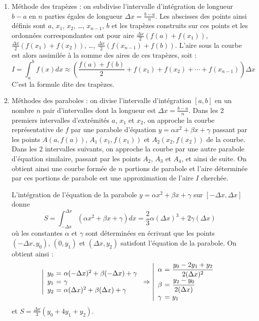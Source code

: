 \documentclass[11pt,a4paper,colorlinks,breaklinks]{article}
\begin{document}
\begin{enumerate}
\item Méthode des trapèzes : on subdivise l'intervalle d'intégration de
	longueur $b-a$ en $n$ parties égales de longueur 
	$\displaystyle\Delta x = \frac{b-a}{n}$. Les abscisses des points ainsi
	définis sont
	$a$, $x_1$, $x_2$, \ldots, $x_{n-1}$, $b$ et les trapèzes construits sur ces
	points et les ordonnées correspondantes ont pour aire 
	$\displaystyle \frac{\Delta x}{2}\left(f(a) + f(x_1)\right)$,
	$\displaystyle \frac{\Delta x}{2}\left(f(x_1) + f(x_2)\right)$,
	\ldots,
	$\displaystyle \frac{\Delta x}{2}\left(f(x_{n-1}) + f(b)\right)$.
	L'aire sous la courbe est alors assimilée à la somme des aires de ces 
	trapèzes, soit :
	$$\displaystyle I = \int_a^b f(x)dx \approx
		\left(\frac{f(a)+f(b)}{2} + f(x_1) + f(x_2)
		+ \cdots + f(x_{n-1})\right) \Delta x$$
	C'est la formule dite des trapèzes.
		
\item Méthodes des paraboles : on divise l'intervalle d'intégration $[a,b]$ en un nombre 
	$n$ pair d'intervalles dont la longueur est 
	$\displaystyle\Delta x = \frac{b-a}{n}$. 
	Dans les 2 premiers intervalles d'extrémités $a$, $x_1$ et $x_2$, on approche 
	la courbe représentative de $f$ par une parabole d'équation 
	$y = \alpha x^2 + \beta x + \gamma$ passant par les points $A(a,f(a))$, 
	$A_1(x_1,f(x_1))$ et $A_2(x_2,f(x_2))$ de la courbe. Dans les 2 intervalles 
	suivants, on approche la courbe par une autre parabole d'équation similaire, 
	passant par les points $A_2$, $A_3$ et $A_4$, et ainsi de suite.
	On obtient ainsi une courbe formée de $n$ portions de parabole et
	l'aire déterminée par ces portions de parabole est une approximation de l'aire $I$
	cherchée.
	
	L'intégration de l'équation de la parabole $y = \alpha x^2 + \beta x + \gamma$ sur
	$\displaystyle \left[-\Delta x,\Delta x\right]$ donne 
	$$S = \int_{-\Delta x}^{\Delta x} (\alpha x^2 + \beta x + \gamma)dx = 
	\frac{2}{3}\alpha(\Delta x)^3 + 2\gamma(\Delta x)$$
	où les constantes $\alpha$ et $\gamma$ sont déterminées en écrivant que les points
	$(-\Delta x,y_0)$, $(0,y_1)$ et $(\Delta x,y_2)$ satisfont l'équation de la parabole.
	On obtient ainsi :
	$$\left|\begin{array}{l@{\ =\ }l}
	y_0 & \alpha(-\Delta x)^2 + \beta(-\Delta x) + \gamma\\
	y_1 & \gamma\\
	y_2 & \alpha(\Delta x)^2 + \beta(\Delta x) + \gamma
	\end{array}\right.
	\Rightarrow
	\left|\begin{array}{l@{\ =\ }l}
	\alpha & \displaystyle \frac{y_0 - 2y_1 + y_2}{2(\Delta x)^2} \\
	\beta  & \displaystyle \frac{y_2-y_0}{2(\Delta x)}\\
	\gamma & \displaystyle y_1
	\end{array}\right.$$
	et $\displaystyle S = \frac{\Delta x}{3}(y_0+4y_1+y_2)$.
	

\end{enumerate}
\end{document}
